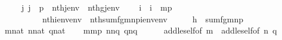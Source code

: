 \begin{isabellebody}
\ \ \ \ {\isachardoublequoteopen}{\isasymAnd}\ j{\isachardot}{\kern0pt}\ j\ {\isacharless}{\kern0pt}\ p\ {\isasymLongrightarrow}\ nth{\isacharparenleft}{\kern0pt}j{\isacharcomma}{\kern0pt}env{}{\isacharparenright}{\kern0pt}\ {\isacharequal}{\kern0pt}\ nth{\isacharparenleft}{\kern0pt}g{\isacharbackquote}{\kern0pt}j{\isacharcomma}{\kern0pt}env{}{\isacharparenright}{\kern0pt}{\isachardoublequoteclose}\isanewline
\ \ \ {\isachardoublequoteopen}{\isasymforall}\ i\ {\isachardot}{\kern0pt}\ i\ {\isacharless}{\kern0pt}\ m{\isacharhash}{\kern0pt}{\isacharplus}{\kern0pt}p\ {\isasymlongrightarrow}\isanewline
\ \ \ \ \ \ \ \ \ \ nth{\isacharparenleft}{\kern0pt}i{\isacharcomma}{\kern0pt}env{\isacharat}{\kern0pt}env{}{\isacharparenright}{\kern0pt}\ {\isacharequal}{\kern0pt}\ nth{\isacharparenleft}{\kern0pt}sum{\isacharparenleft}{\kern0pt}f{\isacharcomma}{\kern0pt}g{\isacharcomma}{\kern0pt}m{\isacharcomma}{\kern0pt}n{\isacharcomma}{\kern0pt}p{\isacharparenright}{\kern0pt}{\isacharbackquote}{\kern0pt}i{\isacharcomma}{\kern0pt}env{\isacharprime}{\kern0pt}{\isacharat}{\kern0pt}env{}{\isacharparenright}{\kern0pt}{\isachardoublequoteclose}\isanewline
%
\isadelimproof
%
\endisadelimproof
%
\isatagproof
{}\isamarkupfalse%
\ {\isacharminus}{\kern0pt}\isanewline
\ \ \isamarkupfalse%
\ {\isacharquery}{\kern0pt}h\ {\isacharequal}{\kern0pt}\ {\isachardoublequoteopen}sum{\isacharparenleft}{\kern0pt}f{\isacharcomma}{\kern0pt}g{\isacharcomma}{\kern0pt}m{\isacharcomma}{\kern0pt}n{\isacharcomma}{\kern0pt}p{\isacharparenright}{\kern0pt}{\isachardoublequoteclose}\isanewline
\ \ \isamarkupfalse%
\ {\isacartoucheopen}m{\isasymin}nat{\isacartoucheclose}\ {\isacartoucheopen}n{\isasymin}nat{\isacartoucheclose}\ {\isacartoucheopen}q{\isasymin}nat{\isacartoucheclose}\isanewline
\ \ \isamarkupfalse%
\ {\isachardoublequoteopen}m{\isasymle}m{\isacharhash}{\kern0pt}{\isacharplus}{\kern0pt}p{\isachardoublequoteclose}\ {\isachardoublequoteopen}n{\isasymle}n{\isacharhash}{\kern0pt}{\isacharplus}{\kern0pt}q{\isachardoublequoteclose}\ {\isachardoublequoteopen}q{\isasymle}n{\isacharhash}{\kern0pt}{\isacharplus}{\kern0pt}q{\isachardoublequoteclose}\isanewline
\ \ \ \ \isamarkupfalse%
\ add{\isacharunderscore}{\kern0pt}le{\isacharunderscore}{\kern0pt}self{\isacharbrackleft}{\kern0pt}of\ m{\isacharbrackright}{\kern0pt}\ \ add{\isacharunderscore}{\kern0pt}le{\isacharunderscore}{\kern0pt}self{}{\isacharbrackleft}{\kern0pt}of\ n\ q{\isacharbrackright}{\kern0pt}\ \isamarkupfalse%

\end{isabellebody}
